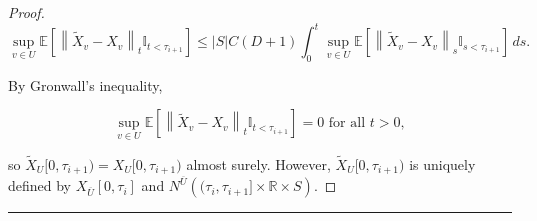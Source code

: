 \documentclass[12pt]{article}
\newcommand{\mb}{\mathbb}
\newcommand{\ov}{\overline}
\newcommand{\te}{\text}
\newcommand{\lin}{\rule{\linewidth}{0.4 pt}}
\newcommand{\ex}[1]{\mb{E}\left[#1\right]}			%
\renewcommand{\v}{v}							%
\renewcommand{\U}{U}							%
\renewcommand{\S}{S}							%
\renewcommand{\t}{t}							%
\renewcommand{\tt}{s}							%
\newcommand{\X}{X}								%
\newcommand{\vind}[1]{^{#1}}					%
\newcommand{\cind}[1]{_{#1}}					%
\newcommand{\cl}{\ov}							%
\newcommand{\tip}[1]{#1}						%
\newcommand{\const}{C}							%
\newcommand{\degr}{D}							%
\newcommand{\poiss}{N}							%
\newcommand{\alt}[1]{\widetilde{#1}}			%
\newcommand{\indx}[1]{_{#1}}					%
\newcommand{\rt}{\tau}							%
\begin{document}
\begin{proof}
\[\sup_{\v\in \U}\ex{\left\|\alt{\X}\cind{\v} - \X\cind{\v}\right\|_{\t}\mb{I}_{\t <\rt\indx{i+1}}} \leq |\S|\const(\degr+1)\int_0^\t\sup_{v\in\U}\ex{\left\|\alt{\X}\cind{\v} - \X\cind{\v}\right\|_\tt\mb{I}_{\tt < \rt\indx{i+1}}}\,d\tt.\]

By Gronwall's inequality,

\[\sup_{v\in \U}\ex{\left\|\alt{\X}\cind{\v} - \X\cind{\v}\right\|_\t\mb{I}_{\t < \rt\indx{i+1}}} = 0 \te{ for all } \t > 0,\]

so \(\alt{\X}\cind{\U}\tip{[0,\rt\indx{i+1})} = \X\cind{\U}\tip{[0,\rt\indx{i+1})}\) almost surely. However, \(\alt{\X}\cind{\U}\tip{[0,\rt\indx{i+1})}\) is uniquely defined by \(\X\cind{\cl{\U}}\tip{[0,\rt\indx{i}]}\) and \(\poiss\vind{\cl{\U}}\left((\rt\indx{i},\rt\indx{i+1}]\times \mb{R}\times \S\right)\).
\end{proof}

\lin
\end{document}
